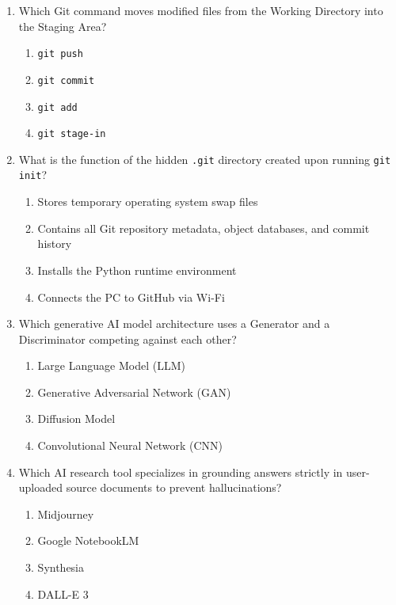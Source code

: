 \begin{enumerate}[leftmargin=1.5em]
    \item Which Git command moves modified files from the Working Directory into the Staging Area?
    \begin{enumerate}[label=(\alph*)]
        \item \texttt{git push}
        \item \texttt{git commit}
        \item \texttt{git add}
        \item \texttt{git stage-in}
    \end{enumerate}

    \item What is the function of the hidden \texttt{.git} directory created upon running \texttt{git init}?
    \begin{enumerate}[label=(\alph*)]
        \item Stores temporary operating system swap files
        \item Contains all Git repository metadata, object databases, and commit history
        \item Installs the Python runtime environment
        \item Connects the PC to GitHub via Wi-Fi
    \end{enumerate}

    \item Which generative AI model architecture uses a Generator and a Discriminator competing against each other?
    \begin{enumerate}[label=(\alph*)]
        \item Large Language Model (LLM)
        \item Generative Adversarial Network (GAN)
        \item Diffusion Model
        \item Convolutional Neural Network (CNN)
    \end{enumerate}

    \item Which AI research tool specializes in grounding answers strictly in user-uploaded source documents to prevent hallucinations?
    \begin{enumerate}[label=(\alph*)]
        \item Midjourney
        \item Google NotebookLM
        \item Synthesia
        \item DALL-E 3
    \end{enumerate}


\end{enumerate}

